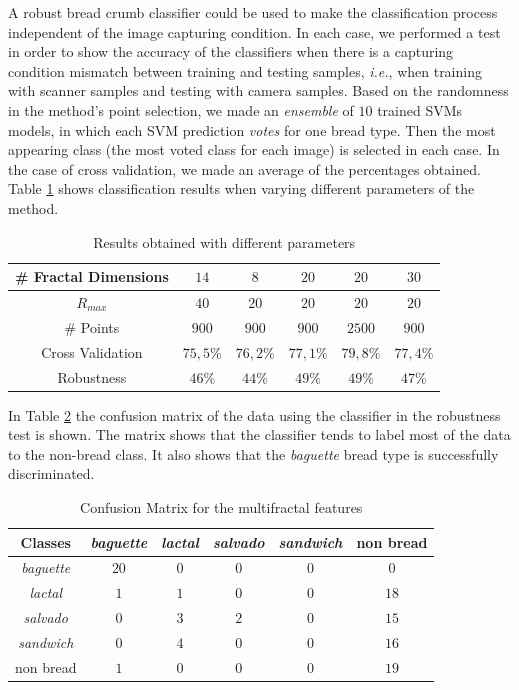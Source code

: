 \documentclass[oneside,a4paper,english,links,12pt]{article}
\begin{document}
A robust bread crumb classifier could be used to make the classification process independent of the image capturing condition. In each case, we performed a test in order to show the accuracy of the classifiers when there is a capturing condition mismatch between training and testing samples, {\em i.e.}, when training with scanner samples and testing with camera samples. Based on the randomness in the method's point selection, we made an {\em ensemble} of $10$ trained SVMs models, in which each SVM prediction {\em votes} for one bread type. Then the most appearing class (the most voted class for each image) is selected in each case. In the case of cross validation, we made an average of the percentages obtained. Table \ref{table:tableFirstTest} shows classification results when varying different parameters of the method.

\begin{table}[htb]
\centering
\begin{tabular}{|c|c|c|c|c|c|}
    \hline
    \# Fractal Dimensions & $14$ & $8$ & $20$ & $20$ & $30$\\
    \hline
    $R_{max}$ & $40$ & $20$ & $20$ & $20$ & $20$\\
    \hline
    \# Points & $900$ & $900$ & $900$ & $2500$ & $900$\\
    \hline
    Cross Validation  & $75,5\%$ & $76,2\%$ & $77,1\%$ & $79,8\%$ & $77,4\%$\\
    \hline
    Robustness & $46\%$ & $44\%$ & $49\%$ & $49\%$ & $47\%$ \\
    \hline
\end{tabular}
\caption{Results obtained with different parameters}
\label{table:tableFirstTest}
\end{table}


In Table \ref{table:ConfusionMatrixFractal} the confusion matrix of the data using the classifier in the robustness test is shown. The matrix shows that the classifier tends to label most of the data to the non-bread class. It also shows that the {\em baguette} bread type is successfully discriminated.
\begin{table}[htb]
\centering
\begin{tabular}{|c|c|c|c|c|c|}
    \hline
    Classes & {\em baguette} & {\em lactal} & {\em salvado} & {\em sandwich} & non bread\\
    \hline
    \hline
    {\em baguette}  & $20$ & $0$ & $0$ & $0$  & $0$\\
    \hline
    {\em lactal}    & $1$ & $1$ & $0$ & $0$  & $18$\\
    \hline
    {\em salvado}   & $0$ & $3$ & $2$ & $0$  & $15$\\
    \hline
    {\em sandwich}  & $0$ & $4$  & $0$ & $0$ & $16$\\
    \hline
    non bread       & $1$ & $0$  & $0$ & $0$  & $19$\\
    \hline
\end{tabular}
\caption{Confusion Matrix for the multifractal features}
\label{table:ConfusionMatrixFractal}
\end{table}
\end{document}
